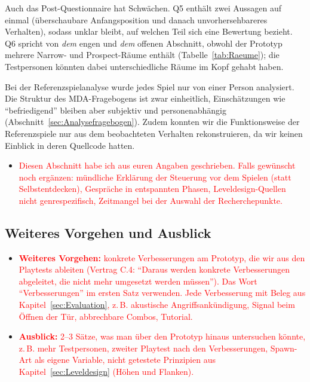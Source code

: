 \documentclass[../Main.tex]{subfiles}
\begin{document}
Auch das Post-Questionnaire hat Schwächen. Q5 enthält zwei Aussagen auf einmal (überschaubare Anfangsposition und danach unvorhersehbareres Verhalten), sodass unklar bleibt, auf welchen Teil sich eine Bewertung bezieht. Q6 spricht von \emph{dem} engen und \emph{dem} offenen Abschnitt, obwohl der Prototyp mehrere Narrow- und Prospect-Räume enthält (Tabelle~\ref{tab:Raeume}); die Testpersonen könnten dabei unterschiedliche Räume im Kopf gehabt haben.

Bei der Referenzspielanalyse wurde jedes Spiel nur von einer Person analysiert. Die Struktur des MDA-Fragebogens ist zwar einheitlich, Einschätzungen wie \enquote{befriedigend} bleiben aber subjektiv und personenabhängig (Abschnitt~\ref{sec:Analysefragebogen}). Zudem konnten wir die Funktionsweise der Referenzspiele nur aus dem beobachteten Verhalten rekonstruieren, da wir keinen Einblick in deren Quellcode hatten.

\begin{itemize}[leftmargin=1.5cm]
    \item \textcolor{red}{Diesen Abschnitt habe ich aus euren Angaben geschrieben. Falls gewünscht noch ergänzen: mündliche Erklärung der Steuerung vor dem Spielen (statt Selbstentdecken), Gespräche in entspannten Phasen, Leveldesign-Quellen nicht genrespezifisch, Zeitmangel bei der Auswahl der Recherchepunkte.}
\end{itemize}

\subsection{Weiteres Vorgehen und Ausblick} \label{sec:Verbesserungen}

\begin{itemize}[leftmargin=1.5cm]
    \item \textcolor{red}{\textbf{Weiteres Vorgehen:} konkrete Verbesserungen am Prototyp, die wir aus den Playtests ableiten (Vertrag C.4: \enquote{Daraus werden konkrete Verbesserungen abgeleitet, die nicht mehr umgesetzt werden müssen}). Das Wort \enquote{Verbesserungen} im ersten Satz verwenden. Jede Verbesserung mit Beleg aus Kapitel~\ref{sec:Evaluation}, z.\,B. akustische Angriffsankündigung, Signal beim Öffnen der Tür, abbrechbare Combos, Tutorial.}
    \item \textcolor{red}{\textbf{Ausblick:} 2--3 Sätze, was man über den Prototyp hinaus untersuchen könnte, z.\,B. mehr Testpersonen, zweiter Playtest nach den Verbesserungen, Spawn-Art als eigene Variable, nicht getestete Prinzipien aus Kapitel~\ref{sec:Leveldesign} (Höhen und Flanken).}
\end{itemize}
\end{document}
